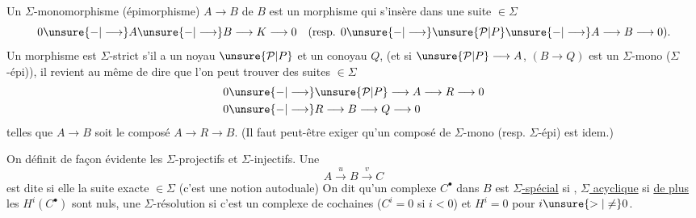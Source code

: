 Un $\Sigma$-monomorphisme (épimorphisme)
$A\longrightarrow B$ de $B$ est un morphisme qui s'insère
dans une suite $\in\Sigma$
\[
0\unsure{-|\longrightarrow}A\unsure{-|\longrightarrow}B\longrightarrow K\longrightarrow0
\quad(\text{resp. }0\unsure{-|\longrightarrow}\unsure{\mathcal P|P}\unsure{-|\longrightarrow}A\longrightarrow B\longrightarrow0).
\]
Un morphisme  est $\Sigma$-strict s'il a un
noyau $\unsure{\mathcal P|P}$ et un conoyau $Q$, 
(et si $\unsure{\mathcal P|P}\longrightarrow A$, $(B\longrightarrow Q)$ est un $\Sigma$-mono ($\Sigma$-épi)), il
revient au même de dire que l'on peut trouver
des suites $\in\Sigma$
\[
\begin{aligned}
0&\unsure{-|\longrightarrow}\unsure{\mathcal P|P}\longrightarrow A\longrightarrow R\longrightarrow0\\
0&\unsure{-|\longrightarrow}R\longrightarrow B\longrightarrow Q\longrightarrow0
\end{aligned}
\]
telles que $A\longrightarrow B$ soit le composé $A\longrightarrow R\longrightarrow B$.
(Il faut peut-être exiger qu'un composé de
$\Sigma$-mono (resp. $\Sigma$-épi) est idem.)

On définit de façon évidente les  $\Sigma$-projectifs
et $\Sigma$-injectifs. Une 
\[
A\xrightarrow{u}B\xrightarrow{v}C
\]
est dite    si elle
la suite exacte $\in\Sigma$
(c'est une notion autoduale) On dit qu'un
complexe $C^\bullet$ dans $B$ est \uline{$\Sigma$-spécial} si ,
\uline{$\Sigma$ acyclique} si \uline{de plus} les $H^i(C^\bullet)$ sont nuls,
une $\Sigma$-résolution si c'est un complexe
de cochaines ($C^i=0$ si $i<0$) et
$H^i=0$ pour $i\unsure{>|\neq}0$.

